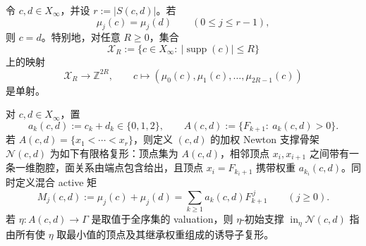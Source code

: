 \begin{proposition}[活动支撑决定有限探针深度]\label{prop:distill-khovanskii-active-address-moment-separation}
令 \(c,d\in X_\infty\)，并设 \(r:=|S(c,d)|\)。若
\[
\mu_j(c)=\mu_j(d)\qquad(0\le j\le r-1),
\]
则 \(c=d\)。特别地，对任意 \(R\ge0\)，集合
\[
\mathcal X_R:=\{c\in X_\infty:\ |\operatorname{supp}(c)|\le R\}
\]
上的映射
\[
\mathcal X_R\longrightarrow \mathbb Z^{2R},\qquad
c\longmapsto (\mu_0(c),\mu_1(c),\ldots,\mu_{2R-1}(c))
\]
是单射。
\end{proposition}
\begin{definition}\label{distill:khovanskii_newton_polyhedra_fewnomials_and_tropical_skeletons-support_to_skeleton_reduction-weighted-raw-newton-skeleton}
对 \(c,d\in X_\infty\)，置
\[
 a_k(c,d):=c_k+d_k\in\{0,1,2\},\qquad
 A(c,d):=\{F_{k+1}:\ a_k(c,d)>0\}.
\]
若 \(A(c,d)=\{x_1<\cdots <x_r\}\)，则定义 \((c,d)\) 的加权 Newton 支撑骨架 \(\mathcal N(c,d)\) 为如下有限格复形：顶点集为 \(A(c,d)\)，相邻顶点 \(x_i,x_{i+1}\) 之间带有一条一维胞腔，面关系由端点包含给出，且顶点 \(x_i=F_{k_i+1}\) 携带权重 \(a_{k_i}(c,d)\)。同时定义混合 active 矩
\[
 M_j(c,d):=\mu_j(c)+\mu_j(d)=\sum_{k\ge1}a_k(c,d)F_{k+1}^{\,j}\qquad(j\ge0).
\]
若 \(\eta:A(c,d)\to\Gamma\) 是取值于全序集的 valuation，则 \(\eta\)-初始支撑 \(\operatorname{in}_\eta\mathcal N(c,d)\) 指由所有使 \(\eta\) 取最小值的顶点及其继承权重组成的诱导子复形。
\end{definition}

